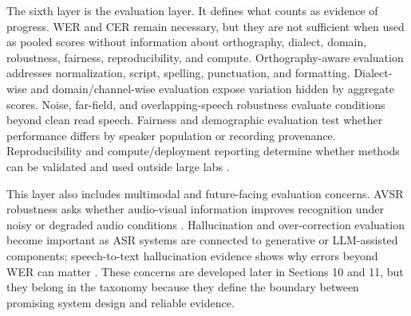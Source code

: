 \documentclass[pdflatex,sn-basic,iicol]{sn-jnl}
\theoremstyle{thmstyleone}
\theoremstyle{thmstyletwo}
\theoremstyle{thmstylethree}
\begin{document}
The sixth layer is the evaluation layer. It defines what counts as evidence of progress. WER and CER remain necessary, but they are not sufficient when used as pooled scores without information about orthography, dialect, domain, robustness, fairness, reproducibility, and compute. Orthography-aware evaluation addresses normalization, script, spelling, punctuation, and formatting. Dialect-wise and domain/channel-wise evaluation expose variation hidden by aggregate scores. Noise, far-field, and overlapping-speech robustness evaluate conditions beyond clean read speech. Fairness and demographic evaluation test whether performance differs by speaker population or recording provenance. Reproducibility and compute/deployment reporting determine whether methods can be validated and used outside large labs \citep{yang2021superb,karita2023lenient,cornell2023chime7,koenecke2020racialdisparities,liu2021casualconversations}.

This layer also includes multimodal and future-facing evaluation concerns. AVSR robustness asks whether audio-visual information improves recognition under noisy or degraded audio conditions \citep{shi2022avhubert,shi2022robustavsr,anwar23_interspeech}. Hallucination and over-correction evaluation become important as ASR systems are connected to generative or LLM-assisted components; speech-to-text hallucination evidence shows why errors beyond WER can matter \citep{koenecke2024carelesswhisper}. These concerns are developed later in Sections 10 and 11, but they belong in the taxonomy because they define the boundary between promising system design and reliable evidence.
\end{document}
